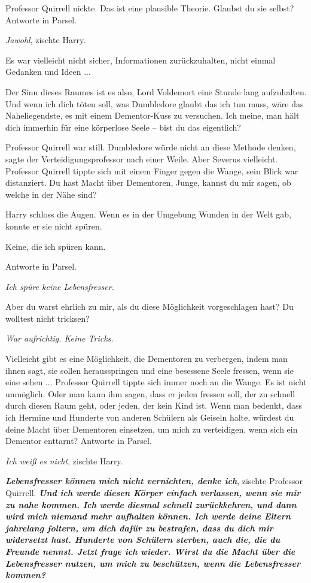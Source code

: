 Professor Quirrell nickte. \glqq{}Das ist eine plausible Theorie. Glaubst du sie
selbst? Antworte in Parsel.\grqq{}

\glqq{}\emph{Jawohl}\grqq{}, zischte Harry.

Es war vielleicht nicht sicher, Informationen zurückzuhalten, nicht einmal
Gedanken und Ideen ...

\glqq{}Der Sinn dieses Raumes ist es also, Lord Voldemort eine Stunde lang
aufzuhalten. Und wenn ich dich töten soll, was Dumbledore glaubt das ich tun
muss, wäre das Naheliegendste, es mit einem Dementor-Kuss zu versuchen. Ich
meine, man hält dich immerhin für eine körperlose Seele – bist du das
eigentlich?\grqq{}

Professor Quirrell war still. \glqq{}Dumbledore würde nicht an diese Methode
denken\grqq{}, sagte der Verteidigungsprofessor nach einer Weile. \glqq{}Aber
Severus vielleicht.\grqq{} Professor Quirrell tippte sich mit einem Finger gegen die
Wange, sein Blick war distanziert. \glqq{}Du hast Macht über Dementoren, Junge,
kannst du mir sagen, ob welche in der Nähe sind?\grqq{}

Harry schloss die Augen. Wenn es in der Umgebung Wunden in der Welt gab, konnte
er sie nicht spüren.

\glqq{}Keine, die ich spüren kann.\grqq{}

\glqq{}Antworte in Parsel.\grqq{}

\glqq{}\emph{Ich spüre keine Lebensfresser.}\grqq{}

\glqq{}Aber du warst ehrlich zu mir, als du diese Möglichkeit vorgeschlagen hast?
Du wolltest nicht tricksen?\grqq{}

\glqq{}\emph{War aufrichtig. Keine Tricks.}\grqq{}

\glqq{}Vielleicht gibt es eine Möglichkeit, die Dementoren zu verbergen, indem
man ihnen sagt, sie sollen herausspringen und eine besessene Seele fressen, wenn
sie eine sehen ...\grqq{} Professor Quirrell tippte sich immer noch an die Wange.
\glqq{}Es ist nicht unmöglich. Oder man kann ihm sagen, dass er jeden fressen
soll, der zu schnell durch diesen Raum geht, oder jeden, der kein Kind ist. Wenn
man bedenkt, dass ich Hermine und Hunderte von anderen Schülern als Geiseln
halte, würdest du deine Macht über Dementoren einsetzen, um mich zu verteidigen,
wenn sich ein Dementor enttarnt? Antworte in Parsel.\grqq{}

\glqq{}\emph{Ich weiß es nicht}\grqq{}, zischte Harry.

\glqq{}\textbf{\emph{Lebensfresser können mich nicht vernichten, denke
ich}}\grqq{}, zischte Professor Quirrell. \glqq{}\textbf{\emph{Und ich werde
diesen Körper einfach verlassen, wenn sie mir zu nahe kommen. Ich werde diesmal
schnell zurückkehren, und dann wird mich niemand mehr aufhalten können. Ich
werde deine Eltern jahrelang foltern, um dich dafür zu bestrafen, dass du dich
mir widersetzt hast. Hunderte von Schülern sterben, auch die, die du Freunde
nennst. Jetzt frage ich wieder. Wirst du die Macht über die Lebensfresser
nutzen, um mich zu beschützen, wenn die Lebensfresser kommen?}}\grqq{}

